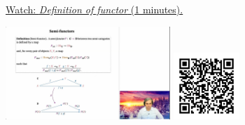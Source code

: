 
\begin{minipage}{10cm}
    \href{https://act4e-spring21.netlify.app/videos/spring2021-functors:semi-and-fun:fun-def.html}{Watch: \emph{Definition of functor} (1 minutes).}
        
    \href{https://act4e-spring21.netlify.app/videos/spring2021-functors:semi-and-fun:fun-def.html}{\includegraphics[height=3.5cm]{spring2021-functors:semi-and-fun:fun-def/thumbnails.jpg}}
    \href{https://act4e-spring21.netlify.app/videos/spring2021-functors:semi-and-fun:fun-def.html}{\includegraphics[height=2.5cm]{spring2021-functors:semi-and-fun:fun-def/qrcode.png}}
\end{minipage}
